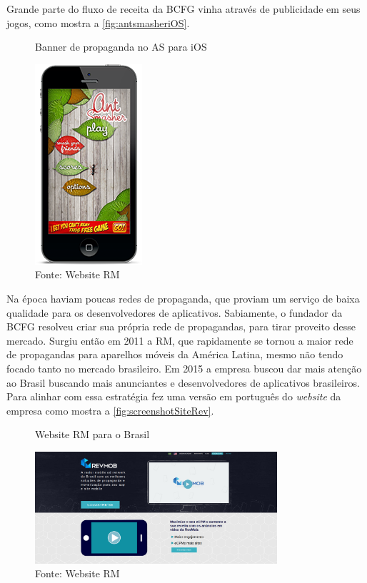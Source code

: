 Grande parte do fluxo de receita da BCFG vinha através de publicidade em seus jogos, como mostra a \autoref{fig:antsmasheriOS}.
\begin{figure}[H]
\caption{Banner de propaganda no AS para iOS}
\centerline{\includegraphics[scale=0.5]{img/antsmasheriOS}}
\label{fig:antsmasheriOS}
\caption* {Fonte: Website RM}
\end{figure}

Na época haviam poucas redes de propaganda, que proviam um serviço de baixa qualidade para os desenvolvedores de aplicativos. Sabiamente, o fundador da BCFG resolveu criar sua própria rede de propagandas, para tirar proveito desse mercado. Surgiu então em 2011 a RM, que rapidamente se tornou a maior rede de propagandas para aparelhos móveis da América Latina, mesmo não tendo focado tanto no mercado brasileiro. Em 2015 a empresa buscou dar mais atenção ao Brasil buscando mais anunciantes e desenvolvedores de aplicativos brasileiros. Para alinhar com essa estratégia fez uma versão em português do \textit{website} da empresa como mostra a \autoref{fig:screenshotSiteRev}.

\begin{figure}[H]
\caption{Website RM para o Brasil}
\centerline{\includegraphics[width=0.8\textwidth]{img/screenshotSiteRev}}
\label{fig:screenshotSiteRev}
\caption* {Fonte: Website RM}
\end{figure}

